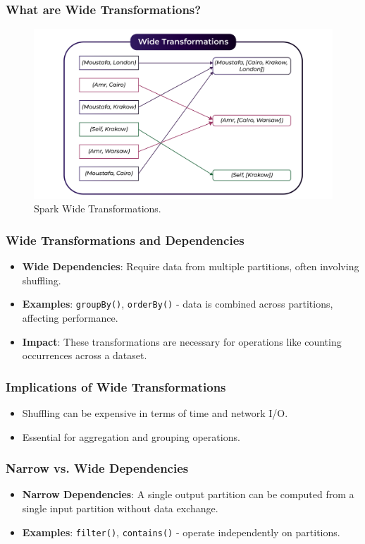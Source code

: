 \begin{frame}
    \frametitle{What are Wide Transformations?}
    \begin{figure}
        \includegraphics[width=\textwidth,height=.75\textheight,keepaspectratio]{./Figures/chapter-04/Wide}
        \caption{Spark Wide Transformations.}\label{fig:spark_wide}
    \end{figure}
\end{frame}

\begin{frame}
    \frametitle{Wide Transformations and Dependencies}
    \begin{itemize}
        \item \textbf{Wide Dependencies}: Require data from multiple partitions, often involving shuffling.
        \item \textbf{Examples}: \texttt{groupBy()}, \texttt{orderBy()} - data is combined across partitions, affecting performance.
        \item \textbf{Impact}: These transformations are necessary for operations like counting occurrences across a dataset.
    \end{itemize}
\end{frame}

\begin{frame}
\frametitle{Implications of Wide Transformations}
\begin{itemize}
    \item Shuffling can be expensive in terms of time and network I/O.
    \item Essential for aggregation and grouping operations.
\end{itemize}
\end{frame}
\begin{frame}
\frametitle{Narrow vs. Wide Dependencies}
\begin{itemize}
    \item \textbf{Narrow Dependencies}: A single output partition can be computed from a single input partition without data exchange.
    \item \textbf{Examples}: \texttt{filter()}, \texttt{contains()} - operate independently on partitions.
\end{itemize}
\end{frame}

